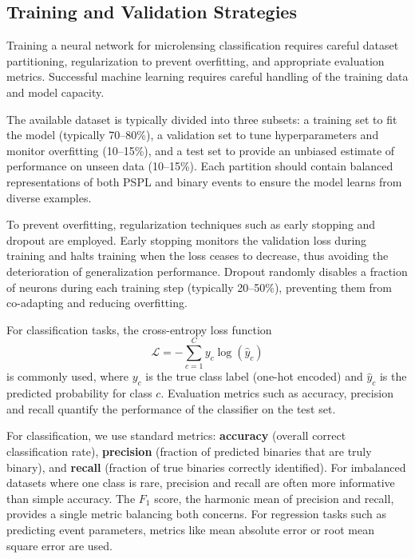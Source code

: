 \subsection{Training and Validation Strategies}
\label{sec:training_strategies}

Training a neural network for microlensing classification requires careful dataset partitioning, regularization to prevent overfitting, and appropriate evaluation metrics. Successful machine learning requires careful handling of the training data and model capacity.

The available dataset is typically divided into three subsets: a training set to fit the model (typically 70–80\%), a validation set to tune hyperparameters and monitor overfitting (10–15\%), and a test set to provide an unbiased estimate of performance on unseen data (10–15\%). Each partition should contain balanced representations of both PSPL and binary events to ensure the model learns from diverse examples.

To prevent overfitting, regularization techniques such as early stopping and dropout are employed. Early stopping monitors the validation loss during training and halts training when the loss ceases to decrease, thus avoiding the deterioration of generalization performance. Dropout randomly disables a fraction of neurons during each training step (typically 20–50\%), preventing them from co-adapting and reducing overfitting.

For classification tasks, the cross-entropy loss function
\begin{equation}
  \mathcal{L} = -\sum_{c=1}^{C} y_c \log(\hat{y}_c)
  \label{eq:cross_entropy}
\end{equation}
is commonly used, where $y_c$ is the true class label (one-hot encoded) and $\hat{y}_c$ is the predicted probability for class $c$. Evaluation metrics such as accuracy, precision and recall quantify the performance of the classifier on the test set.

For classification, we use standard metrics: \textbf{accuracy} (overall correct classification rate), \textbf{precision} (fraction of predicted binaries that are truly binary), and \textbf{recall} (fraction of true binaries correctly identified). For imbalanced datasets where one class is rare, precision and recall are often more informative than simple accuracy. The $F_1$ score, the harmonic mean of precision and recall, provides a single metric balancing both concerns. For regression tasks such as predicting event parameters, metrics like mean absolute error or root mean square error are used.

